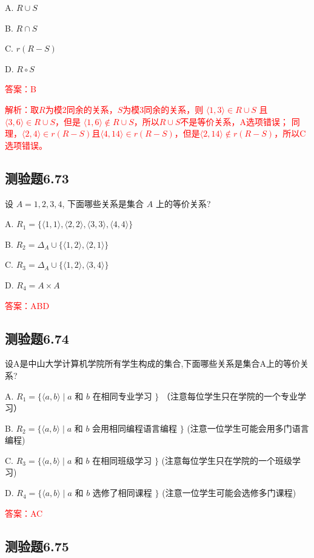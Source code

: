 \documentclass[UTF8, heading=true]{ctexart}
\begin{document}
A. $R \cup S$

B. $R \cap S$

C. $r(R-S)$

D. $R \circ S$

\textcolor{red}{答案：B}

\textcolor{red}{解析：取$R$为模2同余的关系，$S$为模3同余的关系，则 $\langle 1,3\rangle \in R \cup S$ 且 $\langle 3,6\rangle \in R \cup S$，但是 $\langle 1,6\rangle \notin R \cup S$，所以$R \cup S$不是等价关系，A选项错误；
同理，$\langle 2,4 \rangle \in r(R-S)$且$\langle 4,14 \rangle \in r(R-S)$，但是$\langle 2,14 \rangle \notin r(R-S)$，所以C选项错误。}

\subsection{测验题6.73}

设 $A={1,2,3,4}$, 下面哪些关系是集合 $A$ 上的等价关系?

A. $R_1=\{\langle 1,1\rangle,\langle 2,2\rangle,\langle 3,3\rangle,\langle 4,4\rangle\}$

B. $R_2=\Delta_A \cup\{\langle 1,2\rangle,\langle 2,1\rangle\}$

C. 
$R_3=\Delta_A \cup\{\langle 1,2\rangle,\langle 3,4\rangle\}$

D. $R_4=A \times A$

\textcolor{red}{答案：ABD}



\subsection{测验题6.74}

设A是中山大学计算机学院所有学生构成的集合,下面哪些关系是集合A上的等价关系?

A. $R_1=\{\langle a, b\rangle \mid a$ 和 $b$ 在相同专业学习 $\}$ （注意每位学生只在学院的一个专业学习）

B. $R_2=\{\langle a, b\rangle \mid a$ 和 $b$ 会用相同编程语言编程 $\}$ (注意一位学生可能会用多门语言编程)

C. $R_3=\{\langle a, b\rangle \mid a$ 和 $b$ 在相同班级学习 $\}$ (注意每位学生只在学院的一个班级学习)

D. $R_4=\{\langle a, b\rangle \mid a$ 和 $b$ 选修了相同课程 $\}$ (注意一位学生可能会选修多门课程)

\textcolor{red}{答案：AC}

\subsection{测验题6.75}
\end{document}
